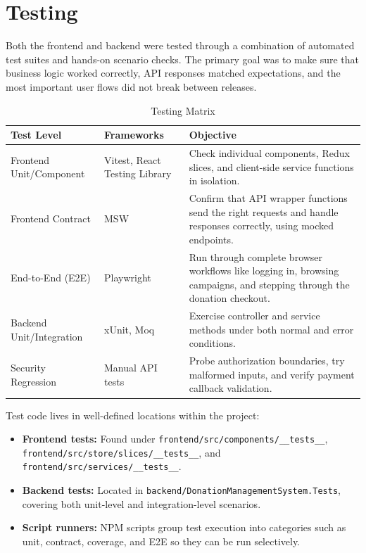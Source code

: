 \documentclass{thesis-library}
\begin{document}
\section{Testing}

Both the frontend and backend were tested through a combination of automated test suites and hands-on scenario checks. The primary goal was to make sure that business logic worked correctly, API responses matched expectations, and the most important user flows did not break between releases.

\begin{table}[H]
    \centering
    \caption{Testing Matrix}
    \vspace{10pt}
    \begin{tabularx}{\linewidth}{|P{3cm}|P{3.5cm}|L|}
        \hline
        \textbf{Test Level} & \textbf{Frameworks} & \textbf{Objective} \\
        \hline
        Frontend Unit/Component & Vitest, React Testing Library & Check individual components, Redux slices, and client-side service functions in isolation. \\
        \hline
        Frontend Contract & MSW & Confirm that API wrapper functions send the right requests and handle responses correctly, using mocked endpoints. \\
        \hline
        End-to-End (E2E) & Playwright & Run through complete browser workflows like logging in, browsing campaigns, and stepping through the donation checkout. \\
        \hline
        Backend Unit/Integration & xUnit, Moq & Exercise controller and service methods under both normal and error conditions. \\
        \hline
        Security Regression & Manual API tests & Probe authorization boundaries, try malformed inputs, and verify payment callback validation. \\
        \hline
    \end{tabularx}
\end{table}

Test code lives in well-defined locations within the project:
\begin{itemize}
    \item \textbf{Frontend tests:} Found under
          \texttt{frontend/src/\allowbreak{}components/\allowbreak{}\_\_tests\_\_},
          \texttt{frontend/src/\allowbreak{}store/\allowbreak{}slices/\allowbreak{}\_\_tests\_\_},
          and \texttt{frontend/src/\allowbreak{}services/\allowbreak{}\_\_tests\_\_}.
    \item \textbf{Backend tests:} Located in
          \texttt{backend/\allowbreak{}DonationManagementSystem.\allowbreak{}Tests},
          covering both unit-level and integration-level scenarios.
    \item \textbf{Script runners:} NPM scripts group test execution into categories such as unit, contract, coverage, and E2E so they can be run selectively.
\end{itemize}
\end{document}
